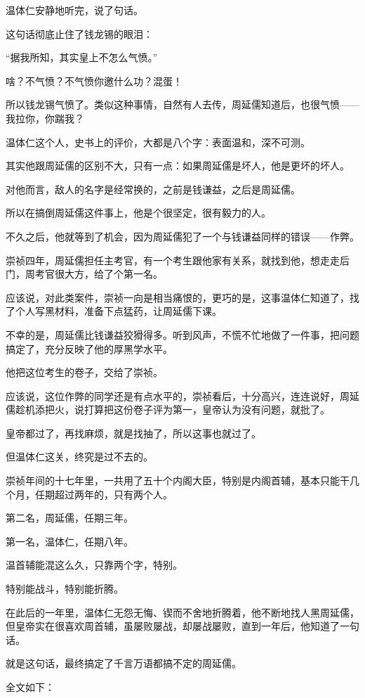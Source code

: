 \begin{multicols}{\theparacolNo}
		温体仁安静地听完，说了句话。

		这句话彻底止住了钱龙锡的眼泪：

		“据我所知，其实皇上不怎么气愤。”

		啥？不气愤？不气愤你邀什么功？混蛋！

		所以钱龙锡气愤了。类似这种事情，自然有人去传，周延儒知道后，也很气愤——我拉你，你踹我？

		温体仁这个人，史书上的评价，大都是八个字：表面温和，深不可测。

		其实他跟周延儒的区别不大，只有一点：如果周延儒是坏人，他是更坏的坏人。

		对他而言，敌人的名字是经常换的，之前是钱谦益，之后是周延儒。

		所以在搞倒周延儒这件事上，他是个很坚定，很有毅力的人。

		不久之后，他就等到了机会，因为周延儒犯了一个与钱谦益同样的错误——作弊。

		崇祯四年，周延儒担任主考官，有一个考生跟他家有关系，就找到他，想走走后门，周考官很大方，给了个第一名。

		应该说，对此类案件，崇祯一向是相当痛恨的，更巧的是，这事温体仁知道了，找了个人写黑材料，准备下点猛药，让周延儒下课。

		不幸的是，周延儒比钱谦益狡猾得多。听到风声，不慌不忙地做了一件事，把问题搞定了，充分反映了他的厚黑学水平。

		他把这位考生的卷子，交给了崇祯。

		应该说，这位作弊的同学还是有点水平的，崇祯看后，十分高兴，连连说好，周延儒趁机添把火，说打算把这份卷子评为第一，皇帝认为没有问题，就批了。

		皇帝都过了，再找麻烦，就是找抽了，所以这事也就过了。

		但温体仁这关，终究是过不去的。

		崇祯年间的十七年里，一共用了五十个内阁大臣，特别是内阁首辅，基本只能干几个月，任期超过两年的，只有两个人。

		第二名，周延儒，任期三年。

		第一名，温体仁，任期八年。

		温首辅能混这么久，只靠两个字，特别。

		特别能战斗，特别能折腾。

		在此后的一年里，温体仁无怨无悔、锲而不舍地折腾着，他不断地找人黑周延儒，但皇帝实在很喜欢周首辅，虽屡败屡战，却屡战屡败，直到一年后，他知道了一句话。

		就是这句话，最终搞定了千言万语都搞不定的周延儒。

		全文如下：


\end{multicols}
